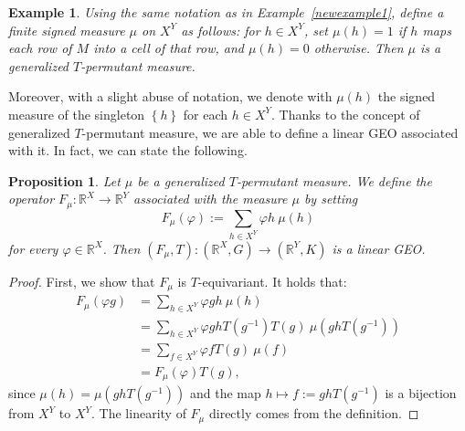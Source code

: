 \documentclass[11pt]{article}
\newcommand{\R}{\mathbb{R}}
\newcommand{\p}{\varphi}
\newtheorem{proposition}[theorem]{Proposition}
\newtheorem{es}[theorem]{Example}
\begin{document}
\begin{es}\label{newexample2}
Using the same notation as in Example~\ref{newexample1}, define a finite signed measure
$\mu$ on $X^{Y}$ as follows: for $h \in X^{Y}$, set
$\mu(h) = 1$ if $h$ maps each row of $M$ into a cell of that row,
and $\mu(h) = 0$ otherwise.
Then $\mu$ is a generalized $T$-permutant
measure.
\end{es}


Moreover, with a slight abuse of notation, we denote with $\mu(h)$ the signed measure of the singleton $\left\{ h \right\}$ for each $h \in X^Y$. Thanks to the concept of generalized $T$-permutant measure, we are able to define a linear GEO associated with it. In fact, we can state the following.

\begin{proposition}
    \label{prop:GEOperm}
    Let $\mu$ be a generalized $T$-permutant measure. We define the operator $F_\mu \colon \R^X \to \R^Y$ associated with the measure $\mu$ by setting
    \[
    F_\mu \left( \p \right) := \sum_{h \in X^Y} \p h \ \mu(h)
    \]
    for every $\p \in \R^X$. Then $(F_\mu,T) \colon (\R^X,G) \to (\R^Y,K)$ is a linear GEO.
\end{proposition}
\begin{proof}
    First, we show that $F_\mu$ is $T$-equivariant. It holds that:
    \begin{align*}
        F_\mu \left( \p g \right) & = \sum_{h \in X^Y} \p g h \ \mu(h) \\
        & = \sum_{h \in X^Y} \p g h T (g^{-1}) T (g) \ \mu\left(g h T(g^{-1})\right) \\
        & = \sum_{f \in X^Y} \p f T(g)\ \mu(f) \\
        & = F_\mu \left( \p \right) T(g),
    \end{align*}
    since $\mu(h) = \mu \left( ghT(g^{-1}) \right)$ and the map $h \mapsto f := g h T(g^{-1})$ is a bijection from $X^Y$ to $X^Y$. The linearity of $F_\mu$ directly comes from the definition.
\end{proof}
\end{document}
